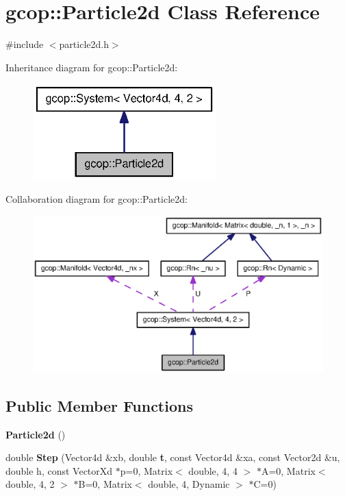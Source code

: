 \section{gcop\-:\-:\-Particle2d \-Class \-Reference}
\label{classgcop_1_1Particle2d}


{\ttfamily \#include $<$particle2d.\-h$>$}



\-Inheritance diagram for gcop\-:\-:\-Particle2d\-:\nopagebreak
\begin{figure}[H]
\begin{center}
\leavevmode
\includegraphics[width=200pt]{classgcop_1_1Particle2d__inherit__graph}
\end{center}
\end{figure}


\-Collaboration diagram for gcop\-:\-:\-Particle2d\-:\nopagebreak
\begin{figure}[H]
\begin{center}
\leavevmode
\includegraphics[width=350pt]{classgcop_1_1Particle2d__coll__graph}
\end{center}
\end{figure}
\subsection*{\-Public \-Member \-Functions}
\begin{DoxyCompactItemize}
\item 
{\bf \-Particle2d} ()
\item 
double {\bf \-Step} (\-Vector4d \&xb, double {\bf t}, const \-Vector4d \&xa, const \-Vector2d \&u, double h, const \-Vector\-Xd $\ast$p=0, \-Matrix$<$ double, 4, 4 $>$ $\ast$\-A=0, \-Matrix$<$ double, 4, 2 $>$ $\ast$\-B=0, \-Matrix$<$ double, 4, \-Dynamic $>$ $\ast$\-C=0)
\end{DoxyCompactItemize}
